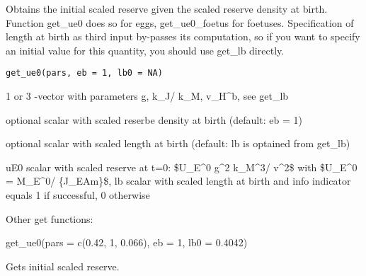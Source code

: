\documentclass[a4paper]{book}
\begin{document}
%
\begin{Description}\relax
Obtains the initial scaled reserve given the scaled reserve density at birth.
Function get\_ue0 does so for eggs, get\_ue0\_foetus for foetuses.
Specification of length at birth as third input by-passes its computation,
so if you want to specify an initial value for this quantity, you should use get\_lb directly.
\end{Description}
%
\begin{Usage}
\begin{verbatim}
get_ue0(pars, eb = 1, lb0 = NA)
\end{verbatim}
\end{Usage}
%
\begin{Arguments}
\begin{ldescription}
\item[\code{pars}] 1 or 3 -vector with parameters g, k\_J/ k\_M, v\_H\textasciicircum{}b, see get\_lb

\item[\code{eb}] optional scalar with scaled reserbe density at birth (default: eb = 1)

\item[\code{lb0}] optional scalar with scaled length at birth (default: lb is optained from get\_lb)
\end{ldescription}
\end{Arguments}
%
\begin{Value}
uE0 scalar with scaled reserve at t=0: \$U\_E\textasciicircum{}0 g\textasciicircum{}2 k\_M\textasciicircum{}3/ v\textasciicircum{}2\$ with \$U\_E\textasciicircum{}0 = M\_E\textasciicircum{}0/ \{J\_EAm\}\$, lb scalar with scaled length at birth and info indicator equals 1 if successful, 0 otherwise
\end{Value}
%
\begin{SeeAlso}\relax
Other get functions: 
\end{SeeAlso}
%
\begin{Examples}
\begin{ExampleCode}
get_ue0(pars = c(0.42, 1, 0.066), eb = 1, lb0 = 0.4042)
\end{ExampleCode}
\end{Examples}
%
\begin{Description}\relax
Gets initial scaled reserve.
\end{Description}
\end{document}
